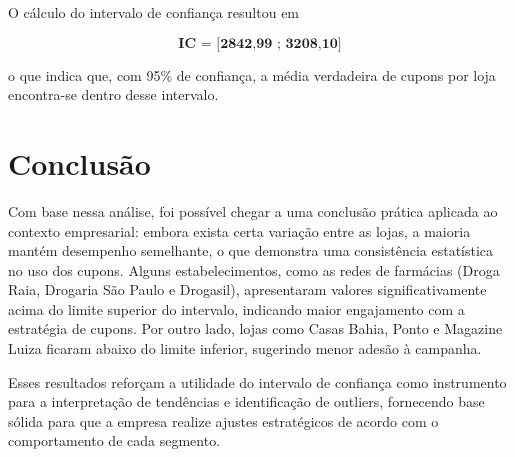 \documentclass[12pt]{article}
\begin{document}
\newpage
\onehalfspacing

O cálculo do intervalo de confiança resultou em

\[
\textbf{IC = [2842,99 ; 3208,10]}
\]

o que indica que, com 95\% de confiança, a média verdadeira de cupons por loja encontra-se dentro desse intervalo.


\section*{Conclusão}

Com base nessa análise, foi possível chegar a uma conclusão prática aplicada ao contexto empresarial:  
embora exista certa variação entre as lojas, a maioria mantém desempenho semelhante, o que demonstra uma consistência estatística no uso dos cupons.  
Alguns estabelecimentos, como as redes de farmácias (Droga Raia, Drogaria São Paulo e Drogasil), apresentaram valores significativamente acima do limite superior do intervalo, indicando maior engajamento com a estratégia de cupons.  
Por outro lado, lojas como Casas Bahia, Ponto e Magazine Luiza ficaram abaixo do limite inferior, sugerindo menor adesão à campanha.

Esses resultados reforçam a utilidade do intervalo de confiança como instrumento para a interpretação de tendências e identificação de outliers, fornecendo base sólida para que a empresa realize ajustes estratégicos de acordo com o comportamento de cada segmento.
\end{document}
